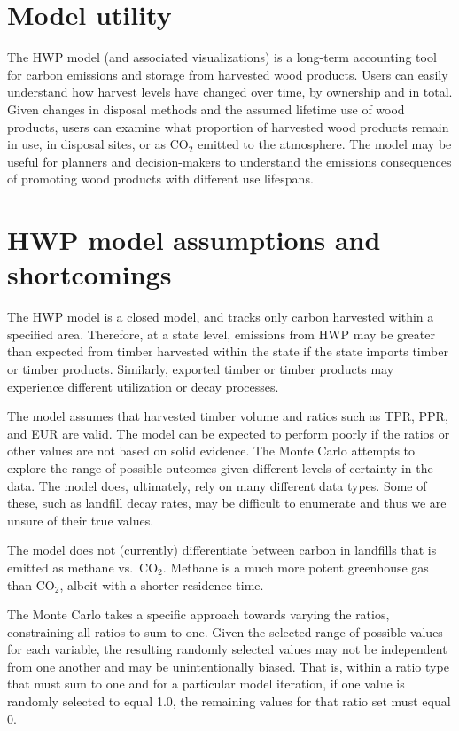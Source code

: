 \documentclass[
]{book}
\begin{document}
\hypertarget{int-util}{%
\section{Model utility}\label{int-util}}

The HWP model (and associated visualizations) is a long-term accounting tool for carbon emissions and storage from harvested wood products. Users can easily understand how harvest levels have changed over time, by ownership and in total. Given changes in disposal methods and the assumed lifetime use of wood products, users can examine what proportion of harvested wood products remain in use, in disposal sites, or as CO\(_2\) emitted to the atmosphere. The model may be useful for planners and decision-makers to understand the emissions consequences of promoting wood products with different use lifespans.

\hypertarget{int-assump}{%
\section{HWP model assumptions and shortcomings}\label{int-assump}}

The HWP model is a closed model, and tracks only carbon harvested within a specified area. Therefore, at a state level, emissions from HWP may be greater than expected from timber harvested within the state if the state imports timber or timber products. Similarly, exported timber or timber products may experience different utilization or decay processes.

The model assumes that harvested timber volume and ratios such as TPR, PPR, and EUR are valid. The model can be expected to perform poorly if the ratios or other values are not based on solid evidence. The Monte Carlo attempts to explore the range of possible outcomes given different levels of certainty in the data. The model does, ultimately, rely on many different data types. Some of these, such as landfill decay rates, may be difficult to enumerate and thus we are unsure of their true values.

The model does not (currently) differentiate between carbon in landfills that is emitted as methane vs.~CO\(_2\). Methane is a much more potent greenhouse gas than CO\(_2\), albeit with a shorter residence time.

The Monte Carlo takes a specific approach towards varying the ratios, constraining all ratios to sum to one. Given the selected range of possible values for each variable, the resulting randomly selected values may not be independent from one another and may be unintentionally biased. That is, within a ratio type that must sum to one and for a particular model iteration, if one value is randomly selected to equal 1.0, the remaining values for that ratio set must equal 0.
\end{document}
